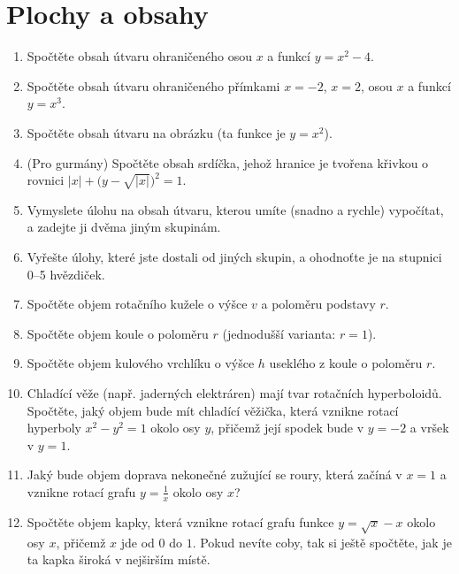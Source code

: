 \documentclass[12pt,a4paper]{article}
\def\tisk{%
\newbox\shipouthackbox
\pdfpagewidth=2\pdfpagewidth
\let\oldshipout=\shipout
\def\shipout{\afterassignment\zdvojtmp \setbox\shipouthackbox=}%
\def\zdvojtmp{\aftergroup\zdvoj}%
\def\zdvoj{%
 	\oldshipout\vbox{\hbox{%
       	\copy\shipouthackbox
        \hskip\dimexpr .5\pdfpagewidth-\wd\shipouthackbox\relax
        \box\shipouthackbox
    }}%
}}%
\begin{document}

\section*{Plochy a obsahy}


\def\vysl#1{\hfill#1\par}
\def\cb#1{$\vcenter{\hbox{#1}}$\quad\ignorespaces}

\begin{enumerate}
	\parskip\medskipamount
	\item Spočtěte obsah útvaru ohraničeného osou $x$ a funkcí $y = x^2 - 4$. %
	\item Spočtěte obsah útvaru ohraničeného přímkami $x=-2$, $x = 2$, osou $x$ a funkcí $y = x^3$. %
	\item Spočtěte obsah útvaru na obrázku (ta funkce je $y = x^2$). %
	\item (Pro gurmány) Spočtěte obsah srdíčka, jehož hranice je tvořena křivkou o rovnici $|x| + \bigl(y-\sqrt{|x|}\bigr)^2 = 1$. %
	\item Vymyslete úlohu na obsah útvaru, kterou umíte (snadno a rychle) vypočítat, a zadejte ji dvěma jiným skupinám.
	\item Vyřešte úlohy, které jste dostali od jiných skupin, a ohodnoťte je na stupnici 0--5 hvězdiček.
	\item Spočtěte objem rotačního kužele o výšce $v$ a poloměru podstavy $r$.
	\item Spočtěte objem koule o poloměru $r$ (jednodušší varianta: $r = 1$).
	\item Spočtěte objem kulového vrchlíku o výšce $h$ useklého z koule o poloměru $r$.
	\item Chladící věže (např. jaderných elektráren) mají tvar rotačních hyperboloidů. Spočtěte, jaký objem bude mít chladící věžička, která vznikne rotací hyperboly $x^2 - y^2 = 1$ okolo osy $y$, přičemž její spodek bude v $y = -2$ a vršek v $y = 1$.
	\item Jaký bude objem doprava nekonečné zužující se roury, která začíná v $x = 1$ a vznikne rotací grafu $y = \frac1x$ okolo osy $x$?
	\item Spočtěte objem kapky, která vznikne rotací grafu funkce $y = \sqrt{x} - x$ okolo osy $x$, přičemž $x$ jde od $0$ do $1$. Pokud nevíte coby, tak si ještě spočtěte, jak je ta kapka široká v nejširším místě.
\end{enumerate}
\end{document}
